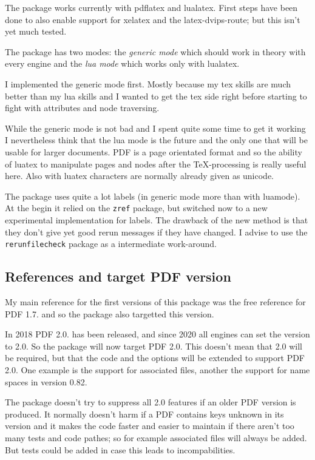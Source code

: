 \documentclass[DIV=12,parskip=half-,bibliography=totoc]{scrartcl}
\newcommand\pkg[1]{\texttt{#1}}
\newcommand\PDF{PDF}
\begin{document}
The package works currently with pdflatex and lualatex. First steps have been done to also enable support for xelatex and the latex-dvips-route; but this isn't yet much tested.

The package has two modes: the \emph{generic mode} which should work in theory with every engine and the \emph{lua mode} which works only with lualatex.

I implemented the generic mode first. Mostly because my tex skills are much better than my lua skills and I wanted to get the tex side right before starting to fight with attributes and node traversing.

While the generic mode is not bad and I spent quite some time to get it working I nevertheless think that the lua mode is the future and the only one that will be usable for larger documents. \PDF{} is a page orientated format and so the ability of luatex to manipulate pages and nodes after the \TeX-processing is really useful here. Also with luatex characters are normally already given as unicode.

The package uses quite a lot labels (in generic mode more than with luamode). At the begin it relied on the \pkg{zref} package, but switched now to a new experimental implementation for labels. The drawback of the new method is that they don't give yet good rerun messages if they have changed. I advise to use the \pkg{rerunfilecheck} package as a intermediate work-around.


\subsection{References and target PDF version}

My main reference for the first versions of this package
was the free reference for \PDF{} 1.7. \parencite{pdfreference} and so the package also targetted this version.

In 2018 \PDF{} 2.0. has been released, and since 2020 all engines can set the version to 2.0. So the package will
now target \PDF{} 2.0. This doesn't mean that 2.0 will be required, but that the code and the options will be extended to
support \PDF{} 2.0. One example is the support for associated files, another the support for name spaces in version 0.82.

The package doesn't try to suppress all 2.0 features if an older \PDF{} version is produced. It normally doesn't harm if a \PDF{} contains keys unknown in its version and it makes the code faster and easier to maintain if there aren't too many tests and code pathes; so for example associated files will always be added. But tests could be added in case this leads to incompabilities.
\end{document}
